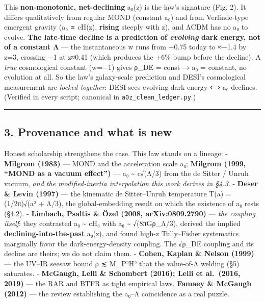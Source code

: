 \documentclass[
]{article}
\begin{document}
This \textbf{non-monotonic, net-declining} a₀(z) is the law's signature
(Fig. 2). It differs qualitatively from regular MOND (constant a₀) and
from Verlinde-type emergent gravity (a₀ ∝ cH(z), \textbf{rising} steeply
with z), and ΛCDM has no a₀ to evolve. \textbf{The late-time decline is
a prediction of \emph{evolving} dark energy, not of a constant Λ} ---
the instantaneous w runs from −0.75 today to ≈−1.4 by z=3, crossing −1
at z≈0.41 (which produces the +6\% bump before the decline). A
\emph{true} cosmological constant (w=−1) gives ρ\_DE = const → a₀ =
constant, no evolution at all. So the law's galaxy-scale prediction and
DESI's cosmological measurement are \emph{locked together}: DESI sees
evolving dark energy ⟺ a₀ declines. (Verified in every script; canonical
in \texttt{a0z\_clean\_ledger.py}.)

\begin{center}\rule{0.5\linewidth}{0.5pt}\end{center}

\subsection{3. Provenance and what is
new}\label{provenance-and-what-is-new}

Honest scholarship strengthens the case. This law stands on a lineage: -
\textbf{Milgrom (1983)} --- MOND and the acceleration scale a₀;
\textbf{Milgrom (1999, ``MOND as a vacuum effect'')} --- a₀
\textasciitilde{} c√(Λ/3) from the de Sitter / Unruh vacuum, \emph{and
the modified-inertia interpolation this work derives in §4.3}. -
\textbf{Deser \& Levin (1997)} --- the kinematic de Sitter--Unruh
temperature T(a) = (1/2π)√(a² + Λ/3), the global-embedding result on
which the existence of a₀ rests (§4.2). - \textbf{Limbach, Psaltis \&
Özel (2008, arXiv:0809.2790)} --- \emph{the coupling itself}: they
contrasted a₀ \textasciitilde{} cH₀ with a₀ \textasciitilde{}
√(8πGρ\_Λ/3), derived the implied \textbf{declining-into-the-past}
a₀(z), and found high-z Tully--Fisher systematics marginally favor the
dark-energy-density coupling. The √ρ\_DE coupling and its decline are
theirs; we do not claim them. - \textbf{Cohen, Kaplan \& Nelson (1999)}
--- the UV--IR seesaw bound ρ ≲ M\_P²H² that the value-of-Λ welding (§5)
saturates. - \textbf{McGaugh, Lelli \& Schombert (2016); Lelli et
al.~(2016, 2019)} --- the RAR and BTFR as tight empirical laws.
\textbf{Famaey \& McGaugh (2012)} --- the review establishing the a₀--Λ
coincidence as a real puzzle.
\end{document}
